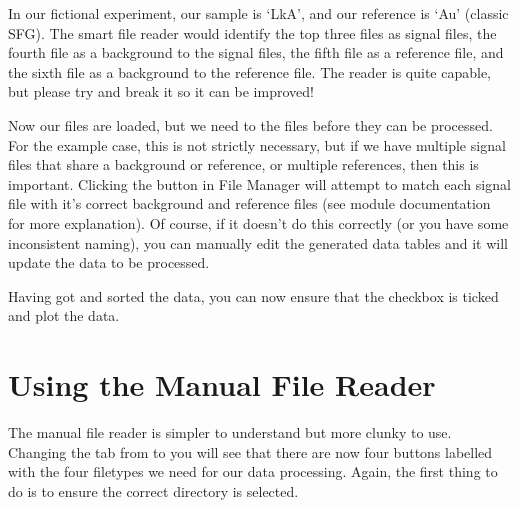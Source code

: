 \documentclass[a4paper,10pt,english]{sphinxmanual}
\begin{document}
\begin{sphinxVerbatim}[commandchars=\\\{\}]
\end{sphinxVerbatim}

\sphinxAtStartPar
In our fictional experiment, our sample is ‘LkA’, and our reference is ‘Au’ (classic SFG). The smart file reader would identify the top three files as signal files, the fourth file as a background to the signal files, the fifth file as a reference file, and the sixth file as a background to the reference file. The reader is quite capable, but please try and break it so it can be improved!

\sphinxAtStartPar
Now our files are loaded, but we need to  the files before they can be processed. For the example case, this is not strictly necessary, but if we have multiple signal files that share a background or reference, or multiple references, then this is important. Clicking the  button in File Manager will attempt to match each signal file with it’s correct background and reference files (see module documentation for more explanation). Of course, if it doesn’t do this correctly (or you have some inconsistent naming), you can manually edit the generated data tables and it will update the data to be processed.

\sphinxAtStartPar
Having got and sorted the data, you can now ensure that the  checkbox is ticked and plot the data.


\section{Using the Manual File Reader}
\label{\detokenize{index:using-the-manual-file-reader}}
\sphinxAtStartPar
The manual file reader is simpler to understand but more clunky to use. Changing the tab from  to  you will see that there are now four buttons labelled with the four filetypes we need for our data processing. Again, the first thing to do is to ensure the correct directory is selected.
\end{document}
